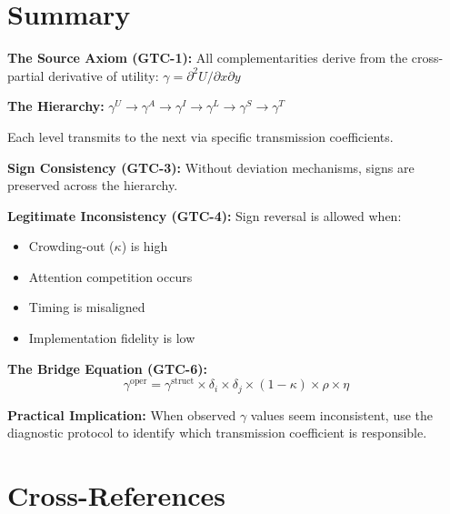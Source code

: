 \section{Summary}
\label{sec:gtc-summary}

\begin{tcolorbox}[colback=blue!5!white, colframe=blue!75!black,
    title=Key Results: General Theory of Complementarity]

\textbf{The Source Axiom (GTC-1):}
All complementarities derive from the cross-partial derivative of utility:
$\gamma = \partial^2 U / \partial x \partial y$

\textbf{The Hierarchy:}
$\gamma^U \to \gamma^A \to \gamma^I \to \gamma^L \to \gamma^S \to \gamma^T$

Each level transmits to the next via specific transmission coefficients.

\textbf{Sign Consistency (GTC-3):}
Without deviation mechanisms, signs are preserved across the hierarchy.

\textbf{Legitimate Inconsistency (GTC-4):}
Sign reversal is allowed when:
\begin{itemize}[nosep]
    \item Crowding-out ($\kappa$) is high
    \item Attention competition occurs
    \item Timing is misaligned
    \item Implementation fidelity is low
\end{itemize}

\textbf{The Bridge Equation (GTC-6):}
\begin{equation}
\gamma^{\text{oper}} = \gamma^{\text{struct}} \times \delta_i \times \delta_j \times (1-\kappa) \times \rho \times \eta
\end{equation}

\textbf{Practical Implication:}
When observed $\gamma$ values seem inconsistent, use the diagnostic protocol
to identify which transmission coefficient is responsible.

\end{tcolorbox}

\section{Cross-References}
\label{sec:gtc-crossref}

